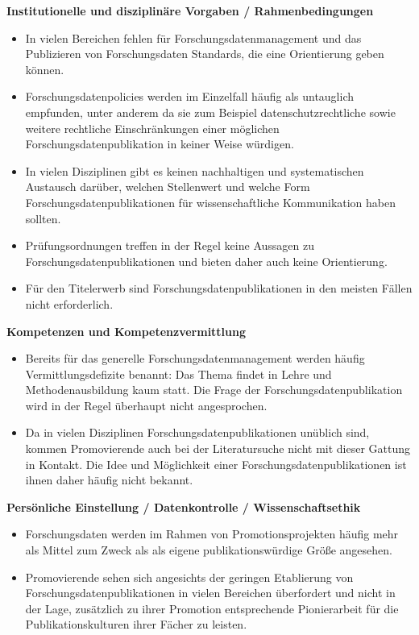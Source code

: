 \documentclass[a4paper,
fontsize=11pt,
oneside,
numbers=noperiodatend,
parskip=half-,
bibliography=totoc,
final
]{scrartcl}
\begin{document}
\textbf{Institutionelle und disziplinäre Vorgaben / Rahmenbedingungen}

\begin{itemize}
\item
  In vielen Bereichen fehlen für Forschungsdatenmanagement und das
  Publizieren von Forschungsdaten Standards, die eine Orientierung geben
  können.
\item
  Forschungsdatenpolicies werden im Einzelfall häufig als untauglich
  empfunden, unter anderem da sie zum Beispiel datenschutzrechtliche
  sowie weitere rechtliche Einschränkungen einer möglichen
  Forschungsdatenpublikation in keiner Weise würdigen.
\item
  In vielen Disziplinen gibt es keinen nachhaltigen und systematischen
  Austausch darüber, welchen Stellenwert und welche Form
  Forschungsdatenpublikationen für wissenschaftliche Kommunikation haben
  sollten.
\item
  Prüfungsordnungen treffen in der Regel keine Aussagen zu
  Forschungsdatenpublikationen und bieten daher auch keine Orientierung.
\item
  Für den Titelerwerb sind Forschungsdatenpublikationen in den meisten
  Fällen nicht erforderlich.
\end{itemize}

\textbf{Kompetenzen und Kompetenzvermittlung}

\begin{itemize}
\item
  Bereits für das generelle Forschungsdatenmanagement werden häufig
  Vermittlungsdefizite benannt: Das Thema findet in Lehre und
  Methodenausbildung kaum statt. Die Frage der
  Forschungsdatenpublikation wird in der Regel überhaupt nicht
  angesprochen.
\item
  Da in vielen Disziplinen Forschungsdatenpublikationen unüblich sind,
  kommen Promovierende auch bei der Literatursuche nicht mit dieser
  Gattung in Kontakt. Die Idee und Möglichkeit einer
  Forschungsdatenpublikationen ist ihnen daher häufig nicht bekannt.
\end{itemize}

\textbf{Persönliche Einstellung / Datenkontrolle / Wissenschaftsethik}

\begin{itemize}
\item
  Forschungsdaten werden im Rahmen von Promotionsprojekten häufig mehr
  als Mittel zum Zweck als als eigene publikationswürdige Größe
  angesehen.
\item
  Promovierende sehen sich angesichts der geringen Etablierung von
  Forschungsdatenpublikationen in vielen Bereichen überfordert und nicht
  in der Lage, zusätzlich zu ihrer Promotion entsprechende Pionierarbeit
  für die Publikationskulturen ihrer Fächer zu leisten.
\end{itemize}
\end{document}
